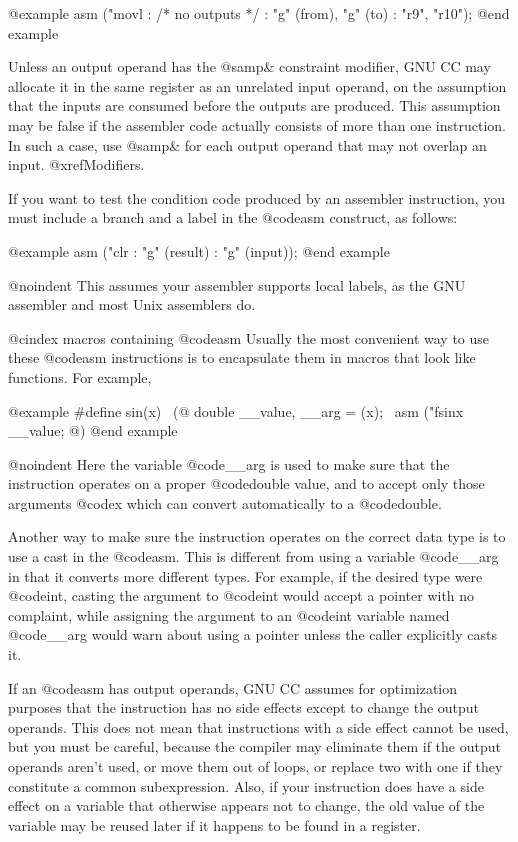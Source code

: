 {{{@example
asm ("movl %
     : /* no outputs */
     : "g" (from), "g" (to)
     : "r9", "r10");
@end example

Unless an output operand has the @samp{&} constraint modifier, GNU CC may
allocate it in the same register as an unrelated input operand, on the
assumption that the inputs are consumed before the outputs are produced.
This assumption may be false if the assembler code actually consists of
more than one instruction.  In such a case, use @samp{&} for each output
operand that may not overlap an input.
@xref{Modifiers}.

If you want to test the condition code produced by an assembler instruction,
you must include a branch and a label in the @code{asm} construct, as follows:

@example
asm ("clr %
     : "g" (result)
     : "g" (input));
@end example

@noindent
This assumes your assembler supports local labels, as the GNU assembler
and most Unix assemblers do.

@cindex macros containing @code{asm}
Usually the most convenient way to use these @code{asm} instructions is to
encapsulate them in macros that look like functions.  For example,

@example
#define sin(x)       \
(@{ double __value, __arg = (x);   \
   asm ("fsinx %
   __value; @})
@end example

@noindent
Here the variable @code{__arg} is used to make sure that the instruction
operates on a proper @code{double} value, and to accept only those
arguments @code{x} which can convert automatically to a @code{double}.

Another way to make sure the instruction operates on the correct data type
is to use a cast in the @code{asm}.  This is different from using a
variable @code{__arg} in that it converts more different types.  For
example, if the desired type were @code{int}, casting the argument to
@code{int} would accept a pointer with no complaint, while assigning the
argument to an @code{int} variable named @code{__arg} would warn about
using a pointer unless the caller explicitly casts it.

If an @code{asm} has output operands, GNU CC assumes for optimization
purposes that the instruction has no side effects except to change the
output operands.  This does not mean that instructions with a side effect
cannot be used, but you must be careful, because the compiler may eliminate
them if the output operands aren't used, or move them out of loops, or
replace two with one if they constitute a common subexpression.  Also, if
your instruction does have a side effect on a variable that otherwise
appears not to change, the old value of the variable may be reused later if
it happens to be found in a register.

}}}
